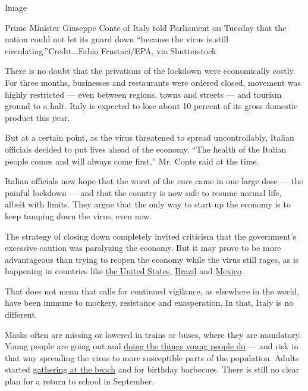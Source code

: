 Image

Prime Minister Giuseppe Conte of Italy told Parliament on Tuesday that
the nation could not let its guard down ``because the virus is still
circulating.''Credit...Fabio Frustaci/EPA, via Shutterstock

There is no doubt that the privations of the lockdown were economically
costly. For three months, businesses and restaurants were ordered
closed, movement was highly restricted --- even between regions, towns
and streets --- and tourism ground to a halt. Italy is expected to lose
about 10 percent of its gross domestic product this year.

But at a certain point, as the virus threatened to spread
uncontrollably, Italian officials decided to put lives ahead of the
economy. ``The health of the Italian people comes and will always come
first,'' Mr. Conte said at the time.

Italian officials now hope that the worst of the cure came in one large
dose --- the painful lockdown --- and that the country is now safe to
resume normal life, albeit with limits. They argue that the only way to
start up the economy is to keep tamping down the virus, even now.

The strategy of closing down completely invited criticism that the
government's excessive caution was paralyzing the economy. But it may
prove to be more advantageous than trying to reopen the economy while
the virus still rages, as is happening in countries like
\href{https://www.nytimes.com/2020/03/13/us/coronavirus-deaths-estimate.html}{the
United States},
\href{https://www.nytimes.com/article/brazil-coronavirus-cases.html}{Brazil}
and
\href{https://www.nytimes.com/2020/06/05/world/americas/coronavirus-mexico-reopening.html}{Mexico}.

That does not mean that calls for continued vigilance, as elsewhere in
the world, have been immune to mockery, resistance and exasperation. In
that, Italy is no different.

Masks often are missing or lowered in trains or buses, where they are
mandatory. Young people are going out and
\href{https://www.nytimes.com/2020/05/29/world/europe/italy-young-people-coronavirus.html}{doing
the things young people do} --- and risk in that way spreading the virus
to more susceptible parts of the population. Adults started
\href{https://www.nytimes.com/2020/05/27/world/europe/italy-beaches-coronavirus-reopening.html}{gathering
at the beach} and for birthday barbecues. There is still no clear plan
for a return to school in September.

